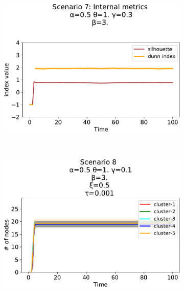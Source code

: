 \begin{figure}[!ht]
\begin{subfigure}[b]{0.32\textwidth}
    \includegraphics[width=\textwidth]{papers/swarm-intelligence2021/img/simulations/standard-updatable-metrics_0_0910_α-0.5_θ-1._γ-0.3_β-3._ω-0._ζ-0..pdf}
  \end{subfigure}
  \\
  \begin{subfigure}[b]{0.32\textwidth}
    \centering
    \includegraphics[width=\textwidth]{papers/swarm-intelligence2021/img/simulations/failScenario_0_034567_α-0.5_θ-1._γ-0.1_β-3._ω-0._ζ-0._ξ-0.5_τ-0.001}
  \end{subfigure}
  \hfill
  \begin{subfigure}[b]{0.32\textwidth}
    \centering

\end{subfigure}
\end{figure}
